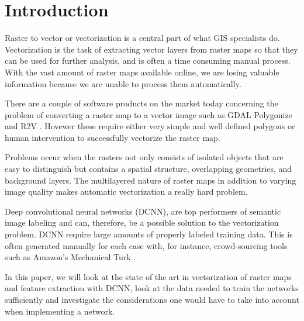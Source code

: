 \chapter{Introduction}
 Raster to vector or vectorization is a central part of what GIS specialists do. Vectorization is the task of extracting vector layers from raster maps so that they can be used for further analysis, and is often a time consuming manual process. With the vast amount of raster maps available online, we are losing valuable information because we are unable to process them automatically.

 There are a couple of software products on the market today concerning the problem of converting a raster map to a vector image such as GDAL Polygonize \cite{OSGeoa} and R2V \cite{Wu1999}. Hovewer these require either very simple and well defined polygons or human intervention to successfully vectorize the raster map.
 
 Problems occur when the rasters not only consists of isolated objects that are easy to distinguish but contains a spatial structure, overlapping geometries, and background layers. The multilayered nature of raster maps in addition to varying image quality makes automatic vectorization a really hard problem.
 
 Deep convolutional neural networks (DCNN), are top performers of semantic image labeling \cite{Krizhevsky2012} and can, therefore, be a possible solution to the vectorization problem. DCNN require large amounts of properly labeled training data. This is often generated manually for each case with, for instance, crowd-sourcing tools such as Amazon's Mechanical Turk \cite{Krizhevsky2012}.
 
 In this paper, we will look at the state of the art in vectorization of raster maps and feature extraction with DCNN, look at the data needed to train the networks sufficiently and investigate the considerations one would have to take into account when implementing a network.
